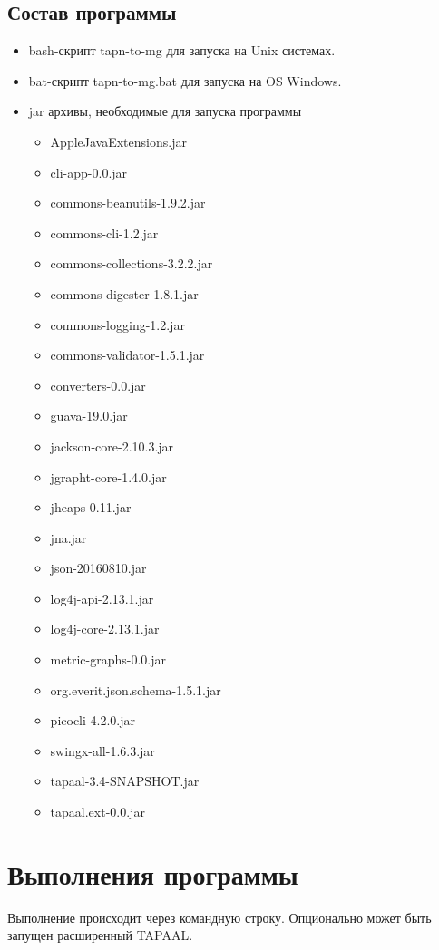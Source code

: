 \documentclass{../TechDoc}
\begin{document}
	\subsection{Состав программы}
	\begin{itemize}
		\item bash-скрипт tapn-to-mg для запуска на Unix системах.
		\item bat-скрипт tapn-to-mg.bat для запуска на OS  Windows.
		\item jar архивы, необходимые для запуска программы
		\begin{itemize}
			\item AppleJavaExtensions.jar
			\item cli-app-0.0.jar
			\item commons-beanutils-1.9.2.jar
			\item commons-cli-1.2.jar
			\item commons-collections-3.2.2.jar
			\item commons-digester-1.8.1.jar
			\item commons-logging-1.2.jar
			\item commons-validator-1.5.1.jar
			\item converters-0.0.jar
			\item guava-19.0.jar
			\item jackson-core-2.10.3.jar
			\item jgrapht-core-1.4.0.jar
			\item jheaps-0.11.jar
			\item jna.jar
			\item json-20160810.jar
			\item log4j-api-2.13.1.jar
			\item log4j-core-2.13.1.jar
			\item metric-graphs-0.0.jar
			\item org.everit.json.schema-1.5.1.jar
			\item picocli-4.2.0.jar
			\item swingx-all-1.6.3.jar
			\item tapaal-3.4-SNAPSHOT.jar
			\item tapaal.ext-0.0.jar
		\end{itemize}
	\end{itemize}

	\section{Выполнения программы}
	Выполнение происходит через командную строку. Опционально может быть запущен расширенный TAPAAL.
	
\end{document}
